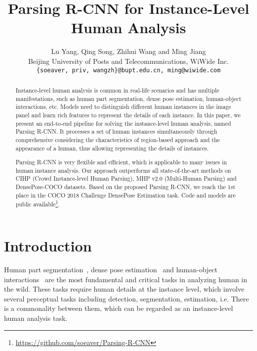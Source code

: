 \documentclass[10pt,twocolumn,letterpaper]{article}
\begin{document}
\title{Parsing R-CNN for Instance-Level Human Analysis}

\author{Lu Yang, Qing Song, Zhihui Wang and Ming Jiang\\
Beijing University of Posts and Telecommunications, WiWide Inc.\\
{\tt\small \{soeaver, priv, wangzh\}@bupt.edu.cn, ming@wiwide.com}
}

\maketitle


\begin{abstract}
   Instance-level human analysis is common in real-life scenarios and has multiple manifestations, such as human part segmentation, dense pose estimation, human-object interactions, etc. Models need to distinguish different human instances in the image panel and learn rich features to represent the details of each instance. In this paper, we present an end-to-end pipeline for solving the instance-level human analysis, named Parsing R-CNN. It processes a set of human instances simultaneously through comprehensive considering the characteristics of region-based approach and the appearance of a human, thus allowing representing the details of instances. 
   
   Parsing R-CNN is very flexible and efficient, which is applicable to many issues in human instance analysis. Our approach outperforms all state-of-the-art methods on CIHP (Crowd Instance-level Human Parsing), MHP v2.0 (Multi-Human Parsing) and DensePose-COCO datasets. Based on the proposed Parsing R-CNN, we reach the 1st place in the COCO 2018 Challenge DensePose Estimation task. Code and models are public available\footnote{\fontsize{7pt}{1em}\url{https://github.com/soeaver/Parsing-R-CNN}}.
\end{abstract}




\section{Introduction}

Human part segmentation~\cite{Liang_tpami2018_lip, Zhao_mm2018_mhpv2, Li_mm2018_mhpm, Gong_eccv2018_pgn}, dense pose estimation~\cite{Guler_cvpr2018_densepose} and human-object interactions~\cite{Hu_cvpr2018_relation, Gkioxari_cvpr2018_interacnet, Gao_bmvc2018_ican} are the most fundamental and critical tasks in analyzing human in the wild. These tasks require human details at the instance level, which involve several perceptual tasks including detection, segmentation, estimation, i.e. There is a commonality between them, which can be regarded as an instance-level human analysis task. 
\end{document}
